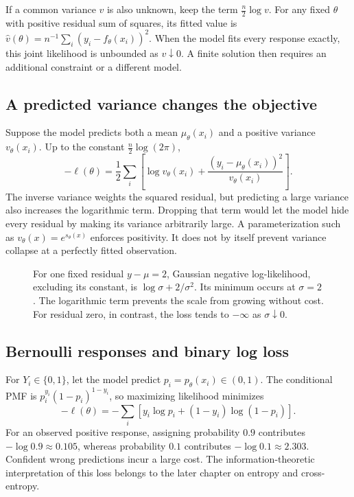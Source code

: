 If a common variance \(v\) is also unknown, keep the term
\(\tfrac n2\log v\). For any fixed \(\theta\) with positive residual
sum of squares, its fitted value is
\(\widehat v(\theta)=n^{-1}\sum_i(y_i-f_\theta(x_i))^2\).
When the model fits every response exactly, this joint likelihood is
unbounded as \(v\downarrow0\). A finite solution then requires an
additional constraint or a different model.

\subsection{A predicted variance changes the objective}

Suppose the model predicts both a mean \(\mu_\theta(x_i)\) and a positive
variance \(v_\theta(x_i)\). Up to the constant \(\tfrac n2\log(2\pi)\),
\begin{equation}
  -\ell(\theta)=\frac12\sum_i\left[
    \log v_\theta(x_i)+\frac{(y_i-\mu_\theta(x_i))^2}{v_\theta(x_i)}
  \right].
  \label{eq:heteroscedastic-loss}
\end{equation}
The inverse variance weights the squared residual, but predicting a large
variance also increases the logarithmic term. Dropping that term would let
the model hide every residual by making its variance arbitrarily large.
A parameterization such as \(v_\theta(x)=e^{s_\theta(x)}\) enforces
positivity. It does not by itself prevent variance collapse at a perfectly
fitted observation.

\begin{figure}[H]
  \centering\EstVarianceLossPlot
  \caption{For one fixed residual \(y-\mu=2\), Gaussian negative
  log-likelihood, excluding its constant, is \(\log\sigma+2/\sigma^2\).
  Its minimum occurs at \(\sigma=2\). The logarithmic term prevents
  the scale from growing without cost. For residual zero, in contrast,
  the loss tends to \(-\infty\) as \(\sigma\downarrow0\).}
  \label{fig:est-variance-loss}
\end{figure}

\subsection{Bernoulli responses and binary log loss}

For \(Y_i\in\{0,1\}\), let the model predict
\(p_i=p_\theta(x_i)\in(0,1)\). The conditional PMF is
\(p_i^{y_i}(1-p_i)^{1-y_i}\), so maximizing likelihood minimizes
\begin{equation}
  -\ell(\theta)
  =-\sum_i\left[y_i\log p_i+(1-y_i)\log(1-p_i)\right].
  \label{eq:bernoulli-log-loss}
\end{equation}
For an observed positive response, assigning probability \(0.9\) contributes
\(-\log0.9\approx0.105\), whereas probability \(0.1\) contributes
\(-\log0.1\approx2.303\). Confident wrong predictions incur a large cost.
The information-theoretic interpretation of this loss belongs to the
later chapter on entropy and cross-entropy.

